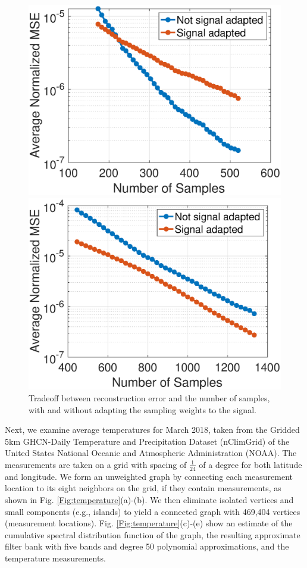 \documentclass[journal, 10pt]{IEEEtran}
\begin{document}
\begin{figure}[H]
\begin{minipage}[m]{0.4\linewidth}
\centerline{\includegraphics[width=.85\linewidth]{fig_rec_low_nmse}}
\end{minipage}
\begin{minipage}[m]{0.4\linewidth}
\centerline{\includegraphics[width=.85\linewidth]{fig_rec_band_nmse}}
\end{minipage}
\caption{Tradeoff between reconstruction error and the number of samples, with and without adapting the sampling weights to the signal.}\label{Fig:samp_tradeoff}
\end{figure}



Next, we examine average temperatures for March 2018, taken from the Gridded 5km GHCN-Daily Temperature and Precipitation Dataset (nClimGrid) \cite{nClimGrid1,nClimGrid2} of the United States National Oceanic and Atmospheric Administration (NOAA). The measurements are taken on a grid with spacing of $\frac{1}{24}$ of a degree for both latitude and longitude. We form an unweighted graph by connecting each measurement location to its eight neighbors on the grid, if they contain measurements, as shown in Fig. \ref{Fig:temperature}(a)-(b). We then eliminate isolated vertices and small components (e.g., islands) to yield a connected graph with 469,404 vertices (measurement locations). Fig. \ref{Fig:temperature}(c)-(e) show an estimate of the cumulative spectral distribution function of the graph, the resulting approximate filter bank with five bands and degree 50 polynomial approximations, and the temperature measurements. 
\end{document}
